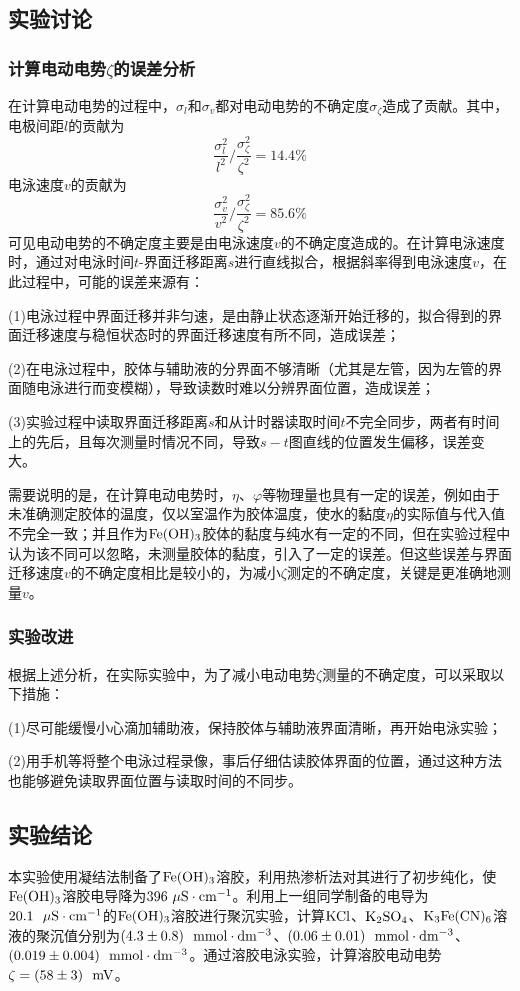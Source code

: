 \documentclass[12pt]{article}
\begin{document}
		\subsection{实验讨论}
 			\subsubsection{计算电动电势$\zeta$的误差分析}
在计算电动电势的过程中，$\sigma_{l}$和$\sigma_{v}$都对电动电势的不确定度$\sigma_{\zeta}$造成了贡献。其中，电极间距$l$的贡献为
$$
\frac{\sigma_{l}^{2}}{l^{2}} / \frac{\sigma_{\zeta}^{2}}{\zeta^{2}}=14.4\%
$$
电泳速度$v$的贡献为
$$
\frac{\sigma_{v}^{2}}{v^{2}} / \frac{\sigma_{\zeta}^{2}}{\zeta^{2}}=85.6\%
$$
可见电动电势的不确定度主要是由电泳速度$v$的不确定度造成的。在计算电泳速度时，通过对电泳时间$t$-界面迁移距离$s$进行直线拟合，根据斜率得到电泳速度$v$，在此过程中，可能的误差来源有：
\par (1)电泳过程中界面迁移并非匀速，是由静止状态逐渐开始迁移的，拟合得到的界面迁移速度与稳恒状态时的界面迁移速度有所不同，造成误差；\par 
(2)在电泳过程中，胶体与辅助液的分界面不够清晰（尤其是左管，因为左管的界面随电泳进行而变模糊），导致读数时难以分辨界面位置，造成误差；\par 
(3)实验过程中读取界面迁移距离$s$和从计时器读取时间$t$不完全同步，两者有时间上的先后，且每次测量时情况不同，导致$s-t$图直线的位置发生偏移，误差变大。\par 
需要说明的是，在计算电动电势时，$\eta$、$\varphi$等物理量也具有一定的误差，例如由于未准确测定胶体的温度，仅以室温作为胶体温度，使水的黏度$\eta$的实际值与代入值不完全一致；并且作为$\rm Fe(OH)_{3}$胶体的黏度与纯水有一定的不同，但在实验过程中认为该不同可以忽略，未测量胶体的黏度，引入了一定的误差。但这些误差与界面迁移速度$v$的不确定度相比是较小的，为减小$\zeta$测定的不确定度，关键是更准确地测量$v$。
 	 	\subsubsection{实验改进}
根据上述分析，在实际实验中，为了减小电动电势$\zeta$测量的不确定度，可以采取以下措施：\par 
(1)尽可能缓慢小心滴加辅助液，保持胶体与辅助液界面清晰，再开始电泳实验；
\par 
(2)用手机等将整个电泳过程录像，事后仔细估读胶体界面的位置，通过这种方法也能够避免读取界面位置与读取时间的不同步。


 	 \subsection{实验结论}
本实验使用凝结法制备了$\rm Fe(OH)_{3}$溶胶，利用热渗析法对其进行了初步纯化，使$\rm Fe(OH)_{3}$溶胶电导降为$396\  {\rm \mu S\cdot cm^{-1}}$。利用上一组同学制备的电导为$20.1\ \ {\rm \mu S\cdot cm^{-1}}$的$\rm Fe(OH)_{3}$溶胶进行聚沉实验，计算$\rm KCl$、$\rm K_{2}SO_{4}$、$\rm K_{3}Fe(CN)_{6}$溶液的聚沉值分别为$(4.3\pm 0.8)\ \ {\rm mmol\cdot dm^{-3}}$、$(0.06\pm 0.01)\ \ {\rm mmol\cdot dm^{-3}}$、$(0.019\pm 0.004)\ \ {\rm mmol\cdot dm^{-3}}$。通过溶胶电泳实验，计算溶胶电动电势$\zeta=(58\pm 3)\ \ {\rm mV}$。


 

   

\vbox{}



\end{document}
